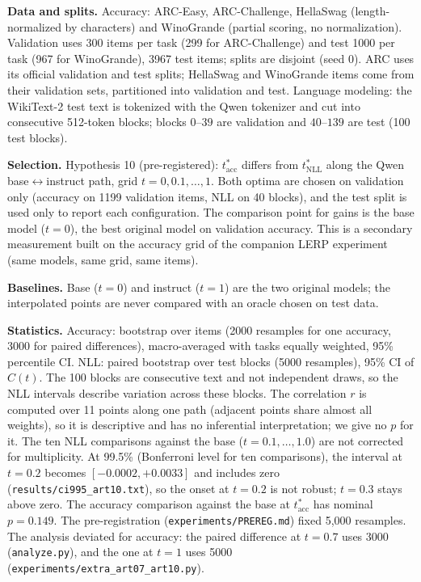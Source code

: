 \documentclass[conference]{IEEEtran}
\begin{document}
\textbf{Data and splits.} Accuracy: ARC-Easy, ARC-Challenge, HellaSwag (length-normalized by characters) and WinoGrande (partial scoring, no normalization). Validation uses 300 items per task (299 for ARC-Challenge) and test 1000 per task (967 for WinoGrande), 3967 test items; splits are disjoint (seed 0). ARC uses its official validation and test splits; HellaSwag and WinoGrande items come from their validation sets, partitioned into validation and test. Language modeling: the WikiText-2 test text is tokenized with the Qwen tokenizer and cut into consecutive 512-token blocks; blocks $0$--$39$ are validation and $40$--$139$ are test (100 test blocks).

\textbf{Selection.} Hypothesis 10 (pre-registered): $t^\ast_{\mathrm{acc}}$ differs from $t^\ast_{\mathrm{NLL}}$ along the Qwen base$\leftrightarrow$instruct path, grid $t=0,0.1,\dots,1$. Both optima are chosen on validation only (accuracy on 1199 validation items, NLL on 40 blocks), and the test split is used only to report each configuration. The comparison point for gains is the base model ($t=0$), the best original model on validation accuracy. This is a secondary measurement built on the accuracy grid of the companion LERP experiment (same models, same grid, same items).

\textbf{Baselines.} Base ($t=0$) and instruct ($t=1$) are the two original models; the interpolated points are never compared with an oracle chosen on test data.

\textbf{Statistics.} Accuracy: bootstrap over items (2000 resamples for one accuracy, 3000 for paired differences), macro-averaged with tasks equally weighted, 95\% percentile CI. NLL: paired bootstrap over test blocks (5000 resamples), 95\% CI of $C(t)$. The 100 blocks are consecutive text and not independent draws, so the NLL intervals describe variation across these blocks. The correlation $r$ is computed over 11 points along one path (adjacent points share almost all weights), so it is descriptive and has no inferential interpretation; we give no $p$ for it. The ten NLL comparisons against the base ($t=0.1,\dots,1.0$) are not corrected for multiplicity. At 99.5\% (Bonferroni level for ten comparisons), the interval at $t=0.2$ becomes $[-0.0002,+0.0033]$ and includes zero (\texttt{results/ci995\_art10.txt}), so the onset at $t=0.2$ is not robust; $t=0.3$ stays above zero. The accuracy comparison against the base at $t^\ast_{\mathrm{acc}}$ has nominal $p=0.149$. The pre-registration (\texttt{experiments/PREREG.md}) fixed 5,000 resamples. The analysis deviated for accuracy: the paired difference at $t=0.7$ uses 3000 (\texttt{analyze.py}), and the one at $t=1$ uses 5000 (\texttt{experiments/extra\_art07\_art10.py}).
\end{document}
